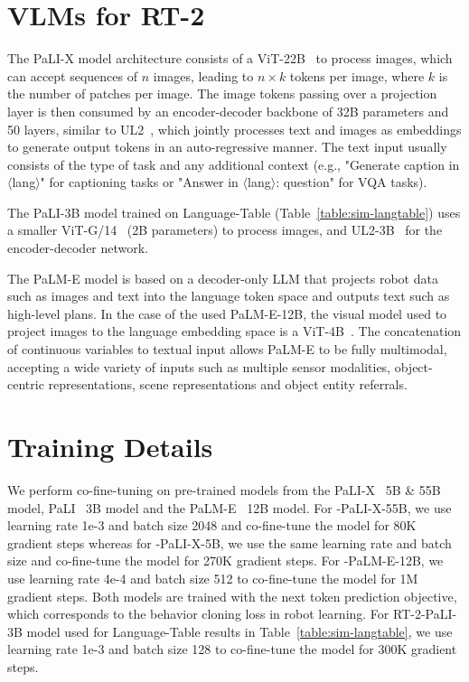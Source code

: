 \section{VLMs for RT-2}
\label{sec:app_vlm}

The PaLI-X model architecture consists of a ViT-22B~\cite{dehghani2023scaling} to process images, which can accept sequences of $n$ images, leading to $n \times k$ tokens per image, where $k$ is the number of patches per image. The image tokens passing over a projection layer is then consumed by an encoder-decoder backbone of 32B parameters and 50 layers, similar to UL2~\cite{tay2023ul2}, which jointly processes text and images as embeddings to generate output tokens in an auto-regressive manner. The text input usually consists of the type of task and any additional context (e.g., "Generate caption in $\langle$lang$\rangle$" for captioning tasks or "Answer in $\langle$lang$\rangle$: {question}" for VQA tasks).

The PaLI-3B model trained on Language-Table (Table~\ref{table:sim-langtable}) uses a smaller ViT-G/14~\citep{zhai2022scaling} (2B parameters) to process images, and UL2-3B~\citep{tay2023ul2} for the encoder-decoder network.

The PaLM-E model is based on a decoder-only LLM that projects robot data such as images and text into the language token space and outputs text such as high-level plans. In the case of the used PaLM-E-12B, the visual model used to project images to the language embedding space is a ViT-4B~\cite{chen2023pali}. The concatenation of continuous variables to textual input allows PaLM-E to be fully multimodal, accepting a wide variety of inputs such as multiple sensor modalities, object-centric representations, scene representations and object entity referrals.

\section{Training Details}
\label{sec:training_details}

We perform co-fine-tuning on pre-trained models from the PaLI-X~\citep{chen2023palix} 5B \& 55B model, PaLI~\citep{chen2023pali} 3B model and the PaLM-E~\citep{driess2023palm} 12B model. For \methodname-PaLI-X-55B, we use learning rate 1e-3 and batch size 2048 and co-fine-tune the model for 80K gradient steps whereas for \methodname-PaLI-X-5B, we use the same learning rate and batch size and co-fine-tune the model for 270K gradient steps. For \methodname-PaLM-E-12B, we use learning rate 4e-4 and batch size 512 to co-fine-tune the model for 1M gradient steps. Both models are trained with the next token prediction objective, which corresponds to the behavior cloning loss in robot learning. For RT-2-PaLI-3B model used for Language-Table results in Table~\ref{table:sim-langtable}, we use learning rate 1e-3 and batch size 128 to co-fine-tune the model for 300K gradient steps.


